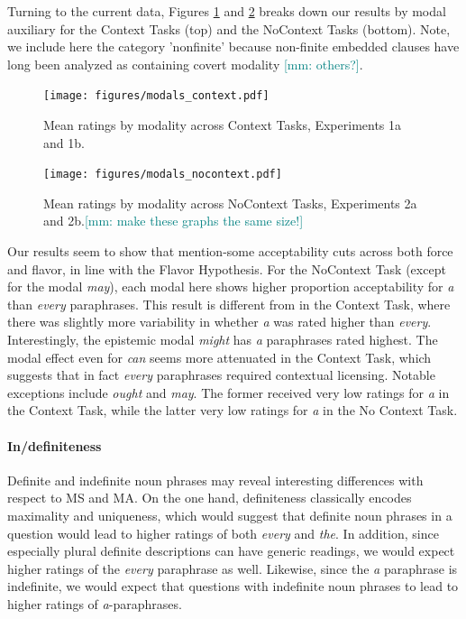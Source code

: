 \documentclass[12pt,letterpaper,table,svgnames,dvipsnames]{article}
\newcommand{\mm}[1]{\textcolor{teal}{[mm: #1]}}
\begin{document}
Turning to the current data, Figures \ref{exs1_modals} and \ref{exs2_modals} breaks down our results by modal auxiliary for the Context Tasks (top) and the NoContext Tasks (bottom). Note, we include here the category 'nonfinite' because non-finite embedded clauses have long been analyzed as containing covert modality \cite{bhatt1999,portner2009}\mm{others?}.

\begin{figure}[h!]
\centering
\texttt{[image: figures/modals\_context.pdf]}
\caption{Mean ratings by modality across Context Tasks, Experiments 1a and 1b.} 
\label{exs1_modals}
\end{figure}

\begin{figure}[h!]
\centering
\texttt{[image: figures/modals\_nocontext.pdf]}
\caption{Mean ratings by modality across NoContext Tasks, Experiments 2a and 2b.\mm{make these graphs the same size!}} 
\label{exs2_modals}
\end{figure}

Our results seem to show that mention-some acceptability cuts across both force and flavor, in line with the Flavor Hypothesis. 
For the NoContext Task (except for the modal \emph{may}), each modal here shows higher proportion acceptability for \emph{a} than \emph{every} paraphrases. This result is different from in the Context Task, where there was slightly more variability in whether \emph{a} was rated higher than \emph{every}. Interestingly, the epistemic modal \emph{might} has \emph{a} paraphrases rated highest. The modal effect even for \emph{can} seems more attenuated in the Context Task, which suggests that in fact \emph{every} paraphrases required contextual licensing. Notable exceptions include \emph{ought} and \emph{may}. The former received very low ratings for \emph{a} in the Context Task,  while the latter very low ratings for \emph{a} in the No Context Task. 


\paragraph{In/definiteness}
Definite and indefinite noun phrases may reveal interesting differences with respect to MS and MA. On the one hand, definiteness classically encodes maximality and uniqueness, which would suggest that definite noun phrases in a question would lead to higher ratings of both \emph{every} and \emph{the}. In addition, since especially plural definite descriptions can have generic readings, we would expect higher ratings of the \emph{every} paraphrase as well. Likewise, since the \emph{a} paraphrase is indefinite, we would expect that questions with indefinite noun phrases to lead to higher ratings of \emph{a}-paraphrases.
\end{document}
